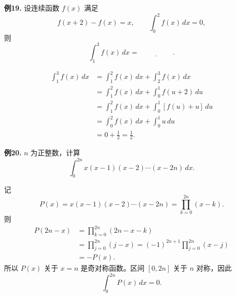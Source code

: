 \begin{problemblock}
\textbf{例19.} 设连续函数 \(f(x)\) 满足
\[
f(x+2)-f(x)=x,\qquad \int_0^2 f(x)\,dx=0,
\]
则
\[
\int_1^3 f(x)\,dx=\underline{\hspace{2cm}}.
\]
\end{problemblock}
\begin{solutionblock}
\[
\begin{aligned}
\int_1^3 f(x)\,dx
&=\int_1^2 f(x)\,dx+\int_2^3 f(x)\,dx\\
&=\int_1^2 f(x)\,dx+\int_0^1 f(u+2)\,du\\
&=\int_1^2 f(x)\,dx+\int_0^1[f(u)+u]\,du\\
&=\int_0^2 f(x)\,dx+\int_0^1u\,du\\
&=0+\frac12=\frac12.
\end{aligned}
\]
\end{solutionblock}

\begin{problemblock}
\textbf{例20.} \(n\) 为正整数，计算
\[
\int_0^{2n}x(x-1)(x-2)\cdots(x-2n)\,dx.
\]
\end{problemblock}
\begin{solutionblock}
记
\[
P(x)=x(x-1)(x-2)\cdots(x-2n)=\prod_{k=0}^{2n}(x-k).
\]
则
\[
\begin{aligned}
P(2n-x)
&=\prod_{k=0}^{2n}(2n-x-k)\\
&=\prod_{j=0}^{2n}(j-x)
=(-1)^{2n+1}\prod_{j=0}^{2n}(x-j)\\
&=-P(x).
\end{aligned}
\]
所以 \(P(x)\) 关于 \(x=n\) 是奇对称函数。区间 \([0,2n]\) 关于 \(n\) 对称，因此
\[
\int_0^{2n}P(x)\,dx=0.
\]
\end{solutionblock}

